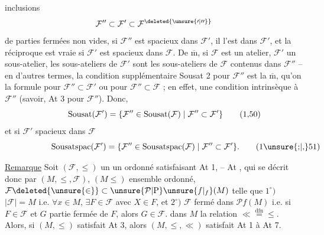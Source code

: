 
inclusions
\[
\mathcal F''\subset\mathcal F'\subset\mathcal F^{\deleted{\unsure{\prime|\prime\prime}}}
\]
de parties fermées non vides, si $\mathcal F''$ est spacieux dans $\mathcal F'$, il l'est dans $\mathcal F'$, et la réciproque est vraie si $\mathcal F'$ est spacieux dans $\mathcal F$. De $\overline{\mathrm m}$, si $\mathcal F$ est un atelier, $\mathcal F'$ un sous-atelier, les sous-ateliers de $\mathcal F'$ sont les sous-ateliers de $\mathcal F$ contenus dans $\mathcal F''$ -- en d'autres termes, la condition supplémentaire Sousat 2 pour $\mathcal F''$ est la $\overline{\mathrm m}$, qu'on la formule pour $\mathcal F''\subset\mathcal F'$ ou pour $\mathcal F''\subset\mathcal F$ ; en effet,  une condition intrinsèque à $\mathcal F''$ (savoir, At 3 pour $\mathcal F''$). Donc, 
\[
\mathrm{Sousat}(\mathcal F')=\{\mathcal F''\in\mathrm{Sousat}(\mathcal F)\mid\mathcal F''\subset\mathcal F'\}
\tag*{\makebox[0pt][r]{\makebox[\displaywidth][l]{(1,50)}}}
\]
et si $\mathcal F'$ spacieux dans $\mathcal F$
\[
\mathrm{Sousatspac}(\mathcal F')=\{\mathcal F''\in\mathrm{Sousatspac}(\mathcal F)\mid\mathcal F''\subset\mathcal F'\}.
\tag*{\makebox[0pt][r]{\makebox[\displaywidth][l]{(1\unsure{;|,}51)}}}
\]

\uline{Remarque} Soit $(\mathcal F,\leq)$ un un ordonné satisfaisant At 1, -- At ,  qui se décrit donc par $(M,\leq,\mathcal F)$,  $(M\leq)$ ensemble ordonné, $\mathcal F\deleted{\unsure{\in}}\subset\unsure{\mathcal P|\mathrm P}\unsure{f|{}_{f}}(M)$  telle que $1^\circ)$ $\lvert\mathcal F\rvert=M$ i.e. $\forall x\in M$, $\exists F\in\mathcal F$ avec $X\in F$, et $2^\circ)$ $\mathcal F$ fermé dans $\mathcal P f(M)$ i.e. si $F\in\mathcal F$ et $G$ partie fermée de $F$, alors $G\in\mathcal F$.  dans $M$ la relation $\ll\mathrel{\overset{\mathrm{dfn}}{=}}\leq$. Alors, si $(M,\leq)$ satisfait At 3, alors $(M,\leq,\ll)$ satisfait At 1 à At 7. 
